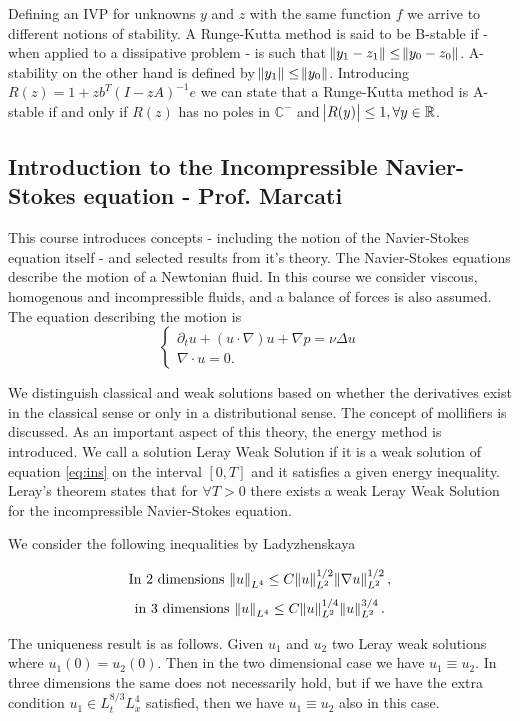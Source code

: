 \documentclass{article}
\begin{document}
Defining an IVP for unknowns $y$ and $z$ with the same function $f$ we arrive to different notions of stability. A Runge-Kutta method is said to be B-stable if - when applied to a dissipative problem - is such that $\norm{y_1 - z_1} \leq \norm{y_0 - z_0}$. A-stability on the other hand is defined by $\norm{y_1} \leq \norm{y_0}$. Introducing $R(z) = 1 + z b^T (I - zA)^{-1}e$ we can state that a Runge-Kutta method is A-stable if and only if $R(z)$ has no poles in $\mathbb{C}^{-}$ and $\abs{R(y)} \leq 1, \forall y \in \mathbb{R}$.

\subsection{Introduction to the Incompressible Navier-Stokes equation - Prof. Marcati}
This course introduces concepts - including the notion of the Navier-Stokes equation itself - and selected results from it's theory. The Navier-Stokes equations describe the motion of a Newtonian fluid. In this course we consider viscous, homogenous and incompressible fluids, and a balance of forces is also assumed. The equation describing the motion is
\begin{equation} \label{eq:ins}
   \begin{cases}
               \partial_t u + (u \cdot \nabla)u + \nabla p = \nu \Delta u\\
               \nabla \cdot u = 0.
   \end{cases}
\end{equation}

We distinguish classical and weak solutions based on whether the derivatives exist in the classical sense or only in a distributional sense. The concept of mollifiers is discussed. As an important aspect of this theory, the energy method is introduced.
We call a solution Leray Weak Solution if it is a weak solution of equation \ref{eq:ins} on the interval $[0,T]$ and it satisfies a given energy inequality. Leray's theorem states that for $\forall T > 0$ there exists a weak Leray Weak Solution for the incompressible Navier-Stokes equation.

We consider the following inequalities by Ladyzhenskaya

\[ \text{In } 2 \text{ dimensions } \norm{u}_{L^4} \leq C \norm{u}_{L^2}^{1/2} \norm{\nabla u}_{L^2}^{1/2}, \]
\[ \text{in } 3 \text{ dimensions } \norm{u}_{L^4} \leq C \norm{u}_{L^2}^{1/4} \norm{u}_{L^2}^{3/4}. \]

The uniqueness result is as follows. Given $u_1$ and $u_2$ two Leray weak solutions where $u_1(0) = u_2(0)$. Then in the two dimensional case we have $u_1 \equiv u_2$. In three dimensions the same does not necessarily hold, but if we have the extra condition $u_1 \in L_t^{8/3}L_x^4$ satisfied, then we have $u_1 \equiv u_2$ also in this case.
\end{document}
